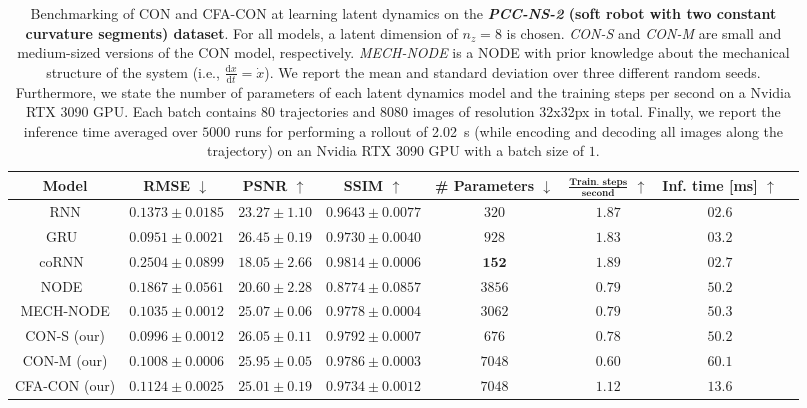 \begin{table}[ht]
    \centering
    \begin{scriptsize}
    \setlength\tabcolsep{2.0pt}
    \begin{tabular}{c c c c c c c c}
         \toprule
         \textbf{Model} & \textbf{RMSE} $\downarrow$ & \textbf{PSNR} $\uparrow$ & \textbf{SSIM} $\uparrow$ & \textbf{\# Parameters} $\downarrow$ & $\mathbf{\frac{\text{Train. steps}}{\text{second}}}$ $\uparrow$ & \textbf{Inf. time} [ms] $\uparrow$\\
         \midrule
         RNN & $0.1373 \pm 0.0185$ & $23.27 \pm 1.10$ & $0.9643 \pm 0.0077$ & $320$ & $1.87$ & $02.6$\\
         GRU~\cite{cho2014learning} & $0.0951 \pm 0.0021$ & $\mathbf{26.45 \pm 0.19}$ & $0.9730 \pm 0.0040$ & $928$ & $1.83$ & $03.2$\\
         coRNN~\cite{rusch2020coupled} & $0.2504 \pm 0.0899$ & $18.05 \pm 2.66$ & $0.9814 \pm 0.0006$ & $\mathbf{152}$ & $\mathbf{1.89}$ & $02.7$\\
         NODE~\cite{chen2018neural} & $0.1867 \pm 0.0561$ & $20.60 \pm 2.28$ & $0.8774 \pm 0.0857$ & $3856$ & $0.79$ & $50.2$\\
         MECH-NODE & $0.1035 \pm 0.0012$ & $25.07 \pm 0.06$ & $0.9778 \pm 0.0004$ & $3062$ & $0.79$ & $50.3$\\
         CON-S (our) & $0.0996 \pm 0.0012$ & $26.05 \pm 0.11$ & $\mathbf{0.9792 \pm 0.0007}$ & $676$ & $0.78$ & $50.2$\\
         CON-M (our) & $0.1008 \pm 0.0006$ & $25.95 \pm 0.05$ & $0.9786 \pm 0.0003$ & $7048$ & $0.60$ & $60.1$\\
         CFA-CON (our) & $0.1124 \pm 0.0025$ & $25.01 \pm 0.19$ & $0.9734 \pm 0.0012$ & $7048$ & $1.12$ & $13.6$\\
         \bottomrule
    \end{tabular}
    \end{scriptsize}
    \vspace{0.5cm}
    \caption{Benchmarking of \gls{CON} and \gls{CFA-CON} at learning latent dynamics on the \textbf{\emph{PCC-NS-2} (soft robot with two constant curvature segments) dataset}. For all models, a latent dimension of $n_z=8$ is chosen. \emph{CON-S} and \emph{CON-M} are small and medium-sized versions of the \gls{CON} model, respectively. \emph{MECH-NODE} is a \gls{NODE} with prior knowledge about the mechanical structure of the system (i.e., $\frac{\mathrm{d}x}{\mathrm{d}t} = \dot{x}$). We report the mean and standard deviation over three different random seeds. Furthermore, we state the number of parameters of each latent dynamics model and the training steps per second on a Nvidia RTX 3090 GPU. Each batch contains $80$ trajectories and $8080$ images of resolution 32x32px in total. Finally, we report the inference time averaged over $5000$ runs for performing a rollout of \SI{2.02}{s} (while encoding and decoding all images along the trajectory) on an Nvidia RTX 3090 GPU with a batch size of $1$.
}
    \label{tab:apx-con:latent_dynamics_results:pcc_ns-2}
\end{table}

